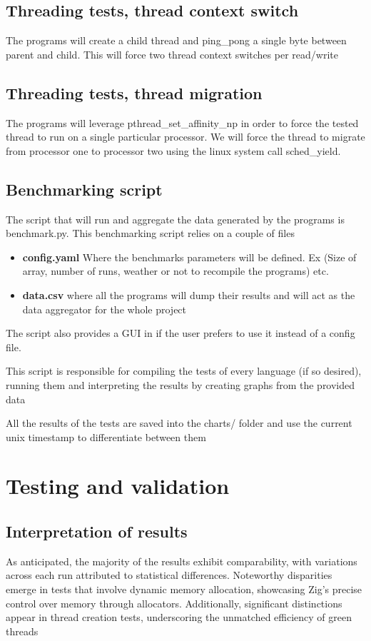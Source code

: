 \documentclass{article}
\begin{document}
\subsection{Threading tests, thread context switch}
The programs will create a child thread and ping\_pong a single byte between parent and child. This will force two thread context switches per read/write
\subsection{Threading tests, thread migration}
The programs will leverage pthread\_set\_affinity\_np in order to force the tested thread to run on a single particular processor. We will force the thread to migrate from processor one to processor two using the linux system call sched\_yield.

\subsection{Benchmarking script}
The script that will run and aggregate the data generated by the programs is benchmark.py. This benchmarking script relies on a couple of files 

\begin{itemize}
    \item \textbf{config.yaml} Where the benchmarks parameters will be defined. Ex (Size of array, number of runs, weather or not to recompile the programs) etc.
    \item \textbf{data.csv} where all the programs will dump their results and will act as the data aggregator for the whole project
\end{itemize}

The script also provides a GUI in if the user prefers to use it instead of a config file.

This script is responsible for compiling the tests of every language (if so desired), running them and interpreting the results by creating graphs from the provided data

All the results of the tests are saved into the charts/ folder and use the current unix timestamp to differentiate between them

\clearpage
\section{Testing and validation}
\subsection{Interpretation of results}
As anticipated, the majority of the results exhibit comparability, with variations across each run attributed to statistical differences. Noteworthy disparities emerge in tests that involve dynamic memory allocation, showcasing Zig's precise control over memory through allocators. Additionally, significant distinctions appear in thread creation tests, underscoring the unmatched efficiency of green threads
\end{document}
